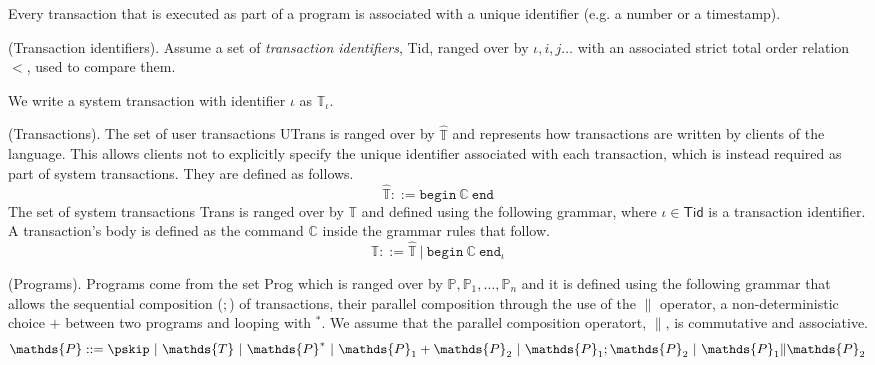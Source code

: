 Every transaction that is executed as part of a program is associated with a unique identifier (e.g. a number or a timestamp).
\begin{param}
	(Transaction identifiers).
	 Assume a set of \emph{transaction identifiers}, \textsf{Tid}, ranged over by $\iota, i, j \ldots$ with an associated strict total order relation $<$, used to compare them.
\end{param}
We write a system transaction with identifier $\iota$ as $\mathds{T}_\iota$. 

\begin{defn}
	(Transactions).
	The set of user transactions \textsf{UTrans} is ranged over by $\hat{\mathds{T}}$ and represents how transactions are written by clients of the language. This allows clients not to explicitly specify the unique identifier associated with each transaction, which is instead required as part of system transactions. They are defined as follows.
	\[
		\hat{\mathds{T}} ::=
			\mathtt{begin}\ \mathds{C}\ \mathtt{end}
	\]
	The set of system transactions \textsf{Trans} is ranged over by $\mathds{T}$ and defined using the following grammar, where $\iota \in \mathsf{Tid}$ is a transaction identifier. A transaction's body is defined as the command $\mathds{C}$ inside the grammar rules that follow.
	\[
		\mathds{T} ::=
			\hat{\mathds{T}}\
			|\ \mathtt{begin}\ \mathds{C}\ \mathtt{end}_\iota
	\]
\end{defn}

\begin{defn}
	(Programs).
	Programs come from the set \textsf{Prog} which is ranged over by $\mathds{P}, \mathds{P}_1, \ldots, \mathds{P}_n$ and it is defined using the following grammar that allows the sequential composition ($;$) of transactions, their parallel composition through the use of the $\|$ operator, a non-deterministic choice $+$ between two programs and looping with $^*$. We assume that the parallel composition operatort, $\|$, is commutative and associative.
	\[
		\mathds{P} ::=
			\pskip\
			|\ \mathds{T}\
			|\ \mathds{P}^*\
			|\ \mathds{P}_1 + \mathds{P}_2\
			|\ \mathds{P}_1; \mathds{P}_2\
			|\ \mathds{P}_1 \| \mathds{P}_2
	\]
\end{defn}